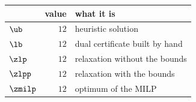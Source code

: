 \begin{center}\small
\begin{tabular}{lrl}
\toprule
 & value & what it is \\
\midrule
$\ub$ & $12$ & heuristic solution \\
$\lb$ & $12$ & dual certificate built by hand \\
$\zlp$ & $12$ & relaxation without the bounds \\
$\zlpp$ & $12$ & relaxation with the bounds \\
$\zmilp$ & $12$ & optimum of the MILP \\
\bottomrule
\end{tabular}
\end{center}
